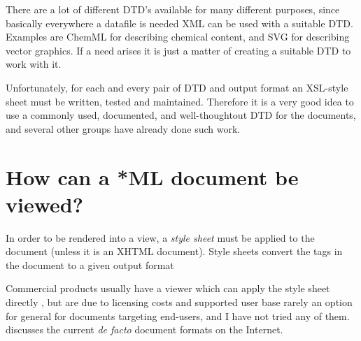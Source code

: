 There are a lot of different DTD's available for many different
purposes, since basically everywhere a datafile is needed XML can be
used with a suitable DTD.  Examples are ChemML for describing chemical
content, and SVG for describing vector graphics. If a need arises it
is just a matter of creating a suitable DTD to work with it.

Unfortunately, for each and every pair of DTD and output format an
XSL-style sheet must be written, tested and maintained.  Therefore it
is a very good idea to use a commonly used, documented, and
well-thoughtout DTD for the documents, and several other groups have
already done such work. 



\section{How can a *ML document be viewed?}

In order to be rendered into a view, a \textit{style sheet} must be
applied to the document (unless it is an XHTML document).  Style
sheets convert the tags in the document to a given output format








Commercial products usually have a viewer which can apply the style
sheet directly%
, but are due to licensing costs and supported user base rarely an
option for general for documents targeting end-users, and I have not
tried any of them.   discusses the
current \textit{de facto} document formats on the Internet.


